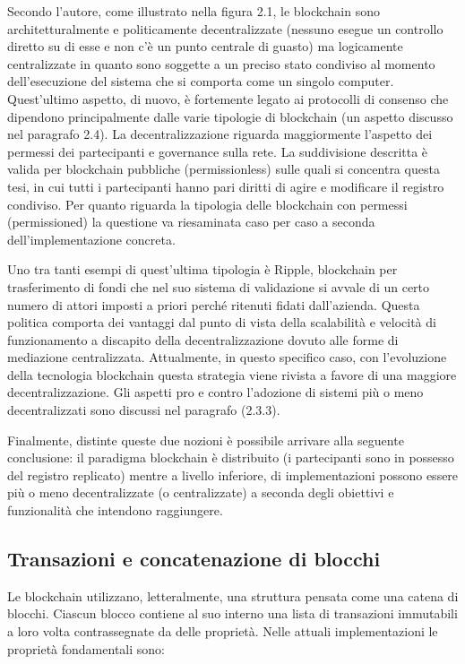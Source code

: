 Secondo l’autore, come illustrato nella figura 2.1, le blockchain sono architetturalmente e politicamente decentralizzate (nessuno esegue un controllo diretto su di esse e non c’è un punto centrale di guasto) ma logicamente centralizzate in quanto sono soggette a un preciso stato condiviso al momento dell'esecuzione del sistema che si comporta come un singolo computer. Quest’ultimo aspetto, di nuovo, è fortemente legato ai protocolli di consenso che dipendono principalmente dalle varie tipologie di blockchain (un aspetto discusso nel paragrafo 2.4). La decentralizzazione riguarda maggiormente l’aspetto dei permessi dei partecipanti e governance sulla rete. La suddivisione descritta è valida per blockchain pubbliche (permissionless) sulle quali si concentra questa tesi, in cui tutti i partecipanti hanno pari diritti di agire e modificare il registro condiviso. Per quanto riguarda la tipologia delle blockchain con permessi (permissioned) la questione va riesaminata caso per caso a seconda dell’implementazione concreta. 

Uno tra tanti esempi di quest’ultima tipologia è Ripple, blockchain per trasferimento di fondi che nel suo sistema di validazione si avvale di un certo numero di attori imposti a priori perché ritenuti fidati dall'azienda. Questa politica comporta dei vantaggi dal punto di vista della scalabilità e velocità di funzionamento a discapito della decentralizzazione dovuto alle forme di mediazione centralizzata. Attualmente, in questo specifico caso, con l’evoluzione della tecnologia blockchain questa strategia viene rivista a favore di una maggiore decentralizzazione. Gli aspetti pro e contro l’adozione di sistemi più o meno decentralizzati sono discussi nel paragrafo (2.3.3).

Finalmente, distinte queste due nozioni è possibile arrivare alla seguente conclusione: il paradigma blockchain è distribuito (i partecipanti sono in possesso del registro replicato) mentre a livello inferiore, di implementazioni possono essere più o meno decentralizzate (o centralizzate) a seconda degli obiettivi e funzionalità che intendono raggiungere.

\subsection{Transazioni e concatenazione di blocchi}

Le blockchain utilizzano, letteralmente, una struttura pensata come una catena di blocchi. Ciascun blocco contiene al suo interno una lista di transazioni immutabili a loro volta contrassegnate da delle proprietà. Nelle attuali implementazioni le proprietà fondamentali sono:

